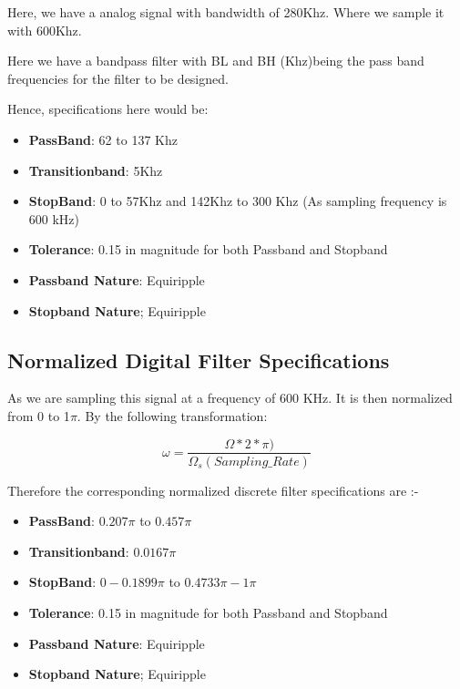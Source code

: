 \documentclass[12pt, letterpaper,]{article}
\begin{document}
Here, we have a analog signal with bandwidth of 280Khz. Where we sample it with 600Khz.

Here we have a bandpass filter with BL and BH (Khz)being the pass band frequencies for the filter to be designed. 

Hence, specifications here would be:
\begin{itemize}

\item \textbf{PassBand}: 62 to 137 Khz

\item \textbf{Transitionband}: 5Khz

\item \textbf{StopBand}: 0 to 57Khz and 142Khz to 300 Khz (As sampling frequency is 600 kHz)

\item \textbf{Tolerance}: 0.15 in magnitude for both Passband and Stopband

\item \textbf{Passband Nature}: Equiripple

\item \textbf{Stopband Nature}; Equiripple

\end{itemize}

\subsection{Normalized Digital Filter Specifications}

As we are sampling this signal at a frequency of 600 KHz. It is then normalized from 0 to   1$\pi$. By the following transformation:

\begin{equation}
    \omega = \frac{\Omega * 2 * \pi)}{\Omega_{s}(Sampling\_Rate)}
\end{equation}

Therefore the corresponding normalized discrete filter specifications are :-

\begin{itemize}

\item \textbf{PassBand}: $0.207\pi$ to $0.457\pi$

\item \textbf{Transitionband}: $0.0167\pi$

\item \textbf{StopBand}: $0 - 0.1899\pi$ to $0.4733\pi - 1\pi$

\item \textbf{Tolerance}: 0.15 in magnitude for both Passband and Stopband

\item \textbf{Passband Nature}: Equiripple

\item \textbf{Stopband Nature}; Equiripple

\end{itemize}
 
\end{document}
